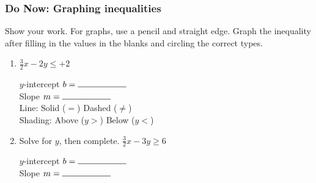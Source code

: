 \documentclass[12pt, twoside]{article}
\begin{document}
\subsubsection*{Do Now: Graphing inequalities}
Show your work. For graphs, {\large use a pencil and straight edge}. Graph the inequality after filling in the values in the blanks and circling the correct types.
  \begin{enumerate}

    \item $\displaystyle \frac{3}{2} x - 2y \leq  +2 $

        \vspace{0.25cm}
        \begin{multicols}{2}
          $y$-intercept $b= \rule{2cm}{0.15mm}$ \\[0.5cm]
          Slope \hspace{0.7cm} $m= \rule{2cm}{0.15mm}$\\[0.5cm]

          Line: \hspace{1cm} Solid ($=$) \hspace{0.45cm} Dashed ($\neq$)\\[0.5cm]
          Shading: \hspace{0.3cm} Above ($y>$) \hspace{0.25cm} Below ($y<$)\\
        \end{multicols}

    \begin{center} %
    \end{center}

    \item Solve for $y$, then complete. $\displaystyle \frac{3}{2} x - 3y \geq 6 $

        \vspace{3cm}
        \begin{multicols}{2}
          \raggedcolumns
          $y$-intercept $b= \rule{2cm}{0.15mm}$ \\[0.5cm]
          Slope \hspace{0.7cm} $m= \rule{2cm}{0.15mm}$\\


\end{multicols}
\end{enumerate}
\end{document}
